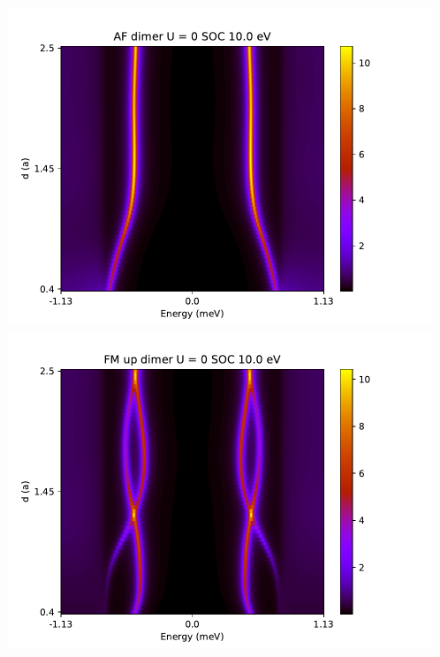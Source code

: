 \documentclass[letterpaper,12pt]{article}
\begin{document}
\begin{figure}[h!]
    \centering
    \includegraphics[scale = .5]{AF_dimer_SOC_10.pdf}
    \includegraphics[scale = .5]{FM_dimer_SOC_10.pdf}
    

\end{figure}
\end{document}
